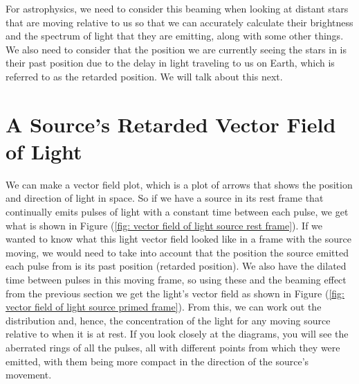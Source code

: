 For astrophysics, we need to consider this beaming when looking at distant stars that are moving relative to us so that we can accurately calculate their brightness and the spectrum of light that they are emitting, along with some other things.
We also need to consider that the position we are currently seeing the stars in is their past position due to the delay in light traveling to us on Earth, which is referred to as the retarded position.
We will talk about this next.

\section{A Source's Retarded Vector Field of Light} \label{sect: Retarded Field}

We can make a vector field plot, which is a plot of arrows that shows the position and direction of light in space.
So if we have a source in its rest frame that continually emits pulses of light with a constant time between each pulse, we get what is shown in Figure (\ref{fig: vector field of light source rest frame}).
If we wanted to know what this light vector field looked like in a frame with the source moving, we would need to take into account that the position the source emitted each pulse from is its past position (retarded position).
We also have the dilated time between pulses in this moving frame, so using these and the beaming effect from the previous section we get the light's vector field as shown in Figure (\ref{fig: vector field of light source primed frame}).
From this, we can work out the distribution and, hence, the concentration of the light for any moving source relative to when it is at rest.
If you look closely at the diagrams, you will see the aberrated rings of all the pulses, all with different points from which they were emitted, with them being more compact in the direction of the source's movement.

